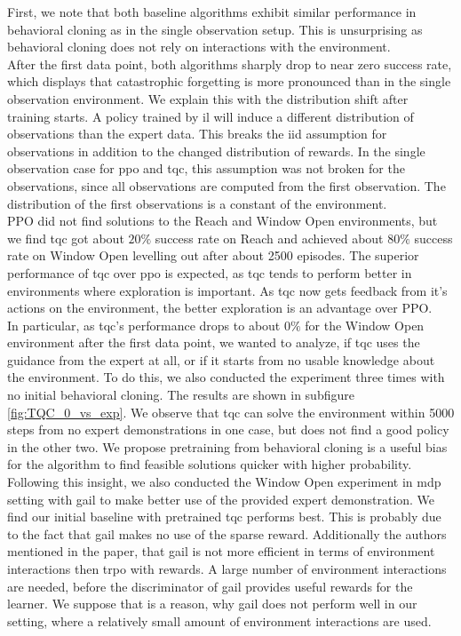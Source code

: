 First, we note that both baseline algorithms exhibit similar performance in behavioral cloning as in the single 
observation setup. This is unsurprising as behavioral cloning does not rely on interactions with the environment. \\

After the first data point, both algorithms sharply drop to near zero success rate, which displays that catastrophic forgetting is more 
pronounced than in the single observation environment. We explain this with the distribution shift after training starts. A policy trained by \ac{il} 
will induce a different distribution of observations than the expert data. This breaks the \ac{iid} assumption for observations in addition to the changed distribution of rewards. 
In the single observation case for \ac{ppo} and \ac{tqc}, this assumption was not broken for the observations, 
since all observations are computed from the first observation. The distribution of the first observations is a constant of the environment.\\

PPO did not find solutions to the Reach and Window Open environments, 
but we find \ac{tqc} got about $20 \%$ success rate on Reach and achieved about $80 \%$ success rate on Window Open levelling out after about 2500 episodes. 
The superior performance of \ac{tqc} over \ac{ppo} is expected, as \ac{tqc} tends to perform better in environments where exploration is important. As \ac{tqc} now gets 
feedback from it's actions on the environment, the better exploration is an advantage over PPO.\\ 

In particular, as \ac{tqc}'s performance drops to about $0 \%$ for the Window Open 
environment after the first data point, we wanted to analyze, if \ac{tqc} uses the guidance from the expert at all, or if it starts from 
no usable knowledge about the environment. To do this, we also conducted the experiment three times with no initial behavioral cloning. The results are shown in 
subfigure \ref{fig:TQC_0_vs_exp}. We observe that \ac{tqc} can solve the environment within 5000 steps from no expert demonstrations in one case, but does not find a good policy in the other two. 
We propose pretraining from behavioral cloning is a useful bias for the algorithm to find feasible solutions quicker with higher probability.\\ 

Following this insight, 
we also conducted the Window Open experiment in \ac{mdp} setting with \ac{gail} to make better use of the provided expert demonstration. We find our initial 
baseline with pretrained \ac{tqc} performs best. This is probably due to the fact that \ac{gail} makes no use of the sparse reward. Additionally 
the authors mentioned in the paper, that \ac{gail} is not more efficient in terms of environment interactions then \ac{trpo} with rewards. A large number of 
environment interactions are needed, before the discriminator of \ac{gail} provides useful rewards for the learner. We suppose that is a reason, why \ac{gail} does not perform 
well in our setting, where a relatively small amount of environment interactions are used. \\

